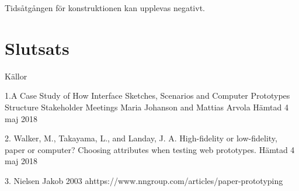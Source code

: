 Tidsåtgången för konstruktionen kan upplevas negativt.

\section{Slutsats}

Källor

1.A Case Study of How Interface Sketches, Scenarios and Computer Prototypes Structure Stakeholder Meetings Maria Johanson and Mattias Arvola Hämtad 4 maj 2018  

2. Walker, M., Takayama, L., and Landay, J. A. High-fidelity or low-fidelity, paper or computer? Choosing attributes when testing web prototypes. Hämtad 4 maj 2018  

3. Nielsen Jakob 2003 
ahttps://www.nngroup.com/articles/paper-prototyping 